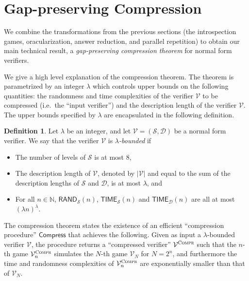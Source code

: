 \documentclass[11pt]{article}
\theoremstyle{definition}
\newtheorem{definition}[theorem]{Definition}
\newcommand{\N}{\ensuremath{\mathbb{N}}}
\newcommand{\abs}[1]{\left\vert {#1} \right\vert}
\newcommand{\sampler}{\mathcal{S}}
\newcommand{\decider}{\mathcal{D}}
\newcommand{\verifier}{\mathcal{V}}
\newcommand{\compr}{\textsc{Compr}}
\newcommand{\TIME}{\mathsf{TIME}}
\newcommand{\RAND}{\mathsf{RAND}}
\newcommand{\tmstyle}[1]{\ensuremath{\mathsf{#1}}}
\newcommand{\Compress}{\tmstyle{Compress}}
\newcommand{\tnote}[1]{}
\begin{document}


\section{Gap-preserving Compression}
\label{sec:compression}

We combine the transformations from the previous sections (the introspection
games, oracularization, answer reduction, and parallel repetition) to obtain our
main technical result, a \emph{gap-preserving compression theorem} for normal
form verifiers.

We give a high level explanation of the compression theorem.
\tnote{was:The input to the theorem; theorems don't take inputs? (My formulation is not great either; no better idea)}The theorem is parametrized by an integer $\lambda$ which controls upper bounds on
the following quantities: the randomness and time complexities of the verifier
$\verifier$ to be compressed (i.e.\ the ``input verifier'') and the description
length of the verifier $\verifier$.
The upper bounds specified by $\lambda$ are encapsulated in the following
definition.

\begin{definition} 
  \label{def:lambda-bounded}
  Let $\lambda$ be an integer, and let $\verifier = (\sampler,\decider)$ be a
  normal form verifier.
  We say that the verifier $\verifier$ is \emph{$\lambda$-bounded} if
 \begin{itemize}
 \item The number of levels of $\sampler$ is at most $8$,
 \item The description length of $\verifier$, denoted by $\abs{\verifier}$ and
   equal to the sum of the description lengths of $\sampler$ and $\decider$,
   is at most $\lambda$, and
 \item For all $n \in \N$, $\RAND_\sampler(n)$, $\TIME_\sampler(n)$ and
   $\TIME_\decider(n)$ are all at most $(\lambda n)^\lambda$.
 \end{itemize}
\end{definition}

\tnote{Reformulated the paragraph}
The compression theorem states the existence of an efficient ``compression procedure'' $\Compress$ that achieves the following.  
 Given as input a
$\lambda$-bounded verifier $\verifier$, the procedure returns a ``compressed verifier'' $\verifier^\compr$ such that the $n$-th game
$\verifier^\compr_n$ simulates the $N$-th game $\verifier_N$ for $N = 2^n$, and
furthermore the time and randomness complexities of $\verifier^\compr_n$ are
exponentially smaller than that of $\verifier_N$.
\end{document}
